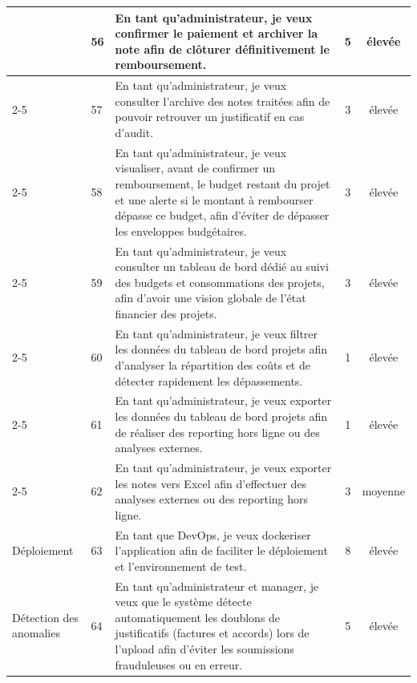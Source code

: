 \documentclass[12pt,a4paper]{report}
\begin{document}
\begin{longtable}{|p{2cm}|p{1cm}|p{8.3cm}|c|c|}
& 56 & En tant qu'administrateur, je veux confirmer le paiement et archiver la note afin de clôturer définitivement le remboursement. & 5 & élevée \\

\cline{2-5}

& 57 & En tant qu'administrateur, je veux consulter l'archive des notes traitées afin de pouvoir retrouver un justificatif en cas d'audit. & 3 & élevée \\

\cline{2-5}

& 58 & En tant qu'administrateur, je veux visualiser, avant de confirmer un remboursement, le budget restant du projet et une alerte si le montant à rembourser dépasse ce budget, afin d'éviter de dépasser les enveloppes budgétaires. & 3 & élevée \\

\cline{2-5}

& 59 & En tant qu'administrateur, je veux consulter un tableau de bord dédié au suivi des budgets et consommations des projets, afin d'avoir une vision globale de l'état financier des projets. & 3 & élevée \\

\cline{2-5}

& 60 & En tant qu'administrateur, je veux filtrer les données du tableau de bord projets afin d'analyser la répartition des coûts et de détecter rapidement les dépassements. & 1 & élevée \\

\cline{2-5}

& 61 & En tant qu'administrateur, je veux exporter les données du tableau de bord projets afin de réaliser des reporting hors ligne ou des analyses externes. & 1 & élevée \\

\cline{2-5}

& 62 & En tant qu'administrateur, je veux exporter les notes vers Excel afin d'effectuer des analyses externes ou des reporting hors ligne. & 3 & moyenne \\

\hline



Déploiement & 63 & En tant que DevOps, je veux dockeriser l'application afin de faciliter le déploiement et l'environnement de test. & 8 & élevée \\

\hline



\multirow{5}{*}{Détection des anomalies} & 64 & En tant qu'administrateur et manager, je veux que le système détecte automatiquement les doublons de justificatifs (factures et accords) lors de l'upload afin d'éviter les soumissions frauduleuses ou en erreur. & 5 & élevée \\


\end{longtable}
\end{document}
